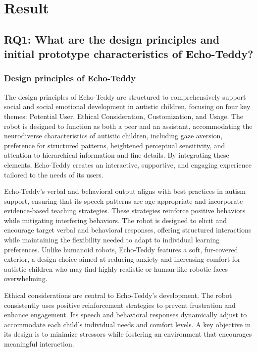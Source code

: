 
\section{Result}

\subsection{RQ1: What are the design principles and initial prototype characteristics of Echo-Teddy?}

\subsubsection{Design principles of Echo-Teddy}


The design principles of Echo-Teddy are structured to comprehensively support social and social emotional development in autistic children, focusing on four key themes: Potential User, Ethical Consideration, Customization, and Usage. The robot is designed to function as both a peer and an assistant, accommodating the neurodiverse characteristics of autistic children, including gaze aversion, preference for structured patterns, heightened perceptual sensitivity, and attention to hierarchical information and fine details. By integrating these elements, Echo-Teddy creates an interactive, supportive, and engaging experience tailored to the needs of its users.

Echo-Teddy’s verbal and behavioral output aligns with best practices in autism support, ensuring that its speech patterns are age-appropriate and incorporate evidence-based teaching strategies. These strategies reinforce positive behaviors while mitigating interfering behaviors. The robot is designed to elicit and encourage target verbal and behavioral responses, offering structured interactions while maintaining the flexibility needed to adapt to individual learning preferences. Unlike humanoid robots, Echo-Teddy features a soft, fur-covered exterior, a design choice aimed at reducing anxiety and increasing comfort for autistic children who may find highly realistic or human-like robotic faces overwhelming.

Ethical considerations are central to Echo-Teddy’s development. The robot consistently uses positive reinforcement strategies to prevent frustration and enhance engagement. Its speech and behavioral responses dynamically adjust to accommodate each child's individual needs and comfort levels. A key objective in its design is to minimize stressors while fostering an environment that encourages meaningful interaction.

